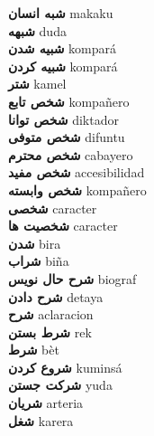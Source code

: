\textbf{ شبه انسان  } makaku \\
\textbf{ شبهه  } duda \\
\textbf{ شبیه شدن  } kompará \\
\textbf{ شبیه کردن  } kompará \\
\textbf{ شتر  } kamel \\
\textbf{ شخص تابع  } kompañero \\
\textbf{ شخص توانا  } diktador \\
\textbf{ شخص متوفی  } difuntu \\
\textbf{ شخص محترم  } cabayero \\
\textbf{ شخص مفید  } accesibilidad \\
\textbf{ شخص وابسته  } kompañero \\
\textbf{ شخصی  } caracter \\
\textbf{ شخصیت ها  } caracter \\
\textbf{ شدن  } bira \\
\textbf{ شراب  } biña \\
\textbf{ شرح حال نویس  } biograf \\
\textbf{ شرح دادن  } detaya \\
\textbf{ شرح  } aclaracion \\
\textbf{ شرط بستن  } rek \\
\textbf{ شرط  } bèt \\
\textbf{ شروع کردن  } kuminsá \\
\textbf{ شرکت جستن  } yuda \\
\textbf{ شریان  } arteria \\
\textbf{ شغل  } karera \\
